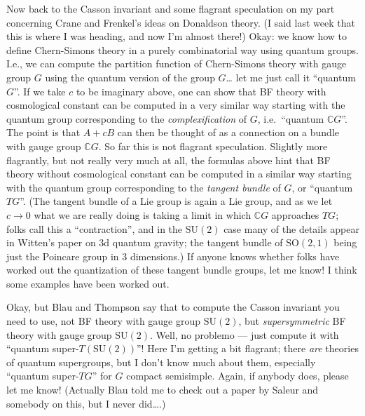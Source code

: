 \documentclass{article}
\begin{document}
Now back to the Casson invariant and some flagrant speculation on my
part concerning Crane and Frenkel's ideas on Donaldson theory. (I said
last week that this is where I was heading, and now I'm almost there!)
Okay: we know how to define Chern-Simons theory in a purely
combinatorial way using quantum groups. I.e., we can compute the
partition function of Chern-Simons theory with gauge group \(G\) using
the quantum version of the group \(G\)\ldots{} let me just call it
``quantum \(G\)''. If we take \(c\) to be imaginary above, one can show
that BF theory with cosmological constant can be computed in a very
similar way starting with the quantum group corresponding to the
\emph{complexification} of \(G\), i.e.~``quantum \(\mathbb{C}G\)''. The
point is that \(A+cB\) can then be thought of as a connection on a
bundle with gauge group \(\mathbb{C}G\). So far this is not flagrant
speculation. Slightly more flagrantly, but not really very much at all,
the formulas above hint that BF theory without cosmological constant can
be computed in a similar way starting with the quantum group
corresponding to the \emph{tangent bundle} of \(G\), or ``quantum
\(TG\)''. (The tangent bundle of a Lie group is again a Lie group, and
as we let \(c \to 0\) what we are really doing is taking a limit in
which \(\mathbb{C}G\) approaches \(TG\); folks call this a
``contraction'', and in the \(\mathrm{SU}(2)\) case many of the details
appear in Witten's paper on 3d quantum gravity; the tangent bundle of
\(\mathrm{SO}(2,1)\) being just the Poincare group in 3 dimensions.) If
anyone knows whether folks have worked out the quantization of these
tangent bundle groups, let me know! I think some examples have been
worked out.

Okay, but Blau and Thompson say that to compute the Casson invariant you
need to use, not BF theory with gauge group \(\mathrm{SU}(2)\), but
\emph{supersymmetric} BF theory with gauge group \(\mathrm{SU}(2)\).
Well, no problemo --- just compute it with ``quantum
super-\(T(\mathrm{SU}(2))\)''! Here I'm getting a bit flagrant; there
\emph{are} theories of quantum supergroups, but I don't know much about
them, especially ``quantum super-\(TG\)'' for \(G\) compact semisimple.
Again, if anybody does, please let me know! (Actually Blau told me to
check out a paper by Saleur and somebody on this, but I never
did\ldots.)
\end{document}
